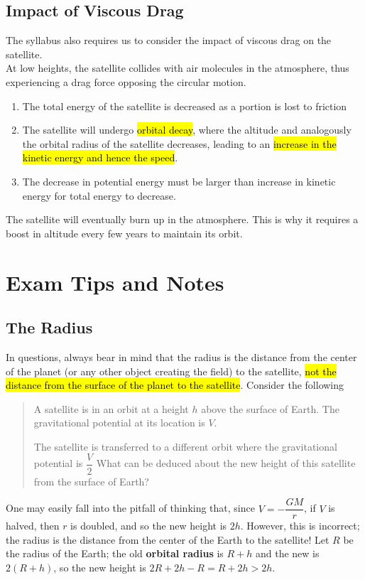 \documentclass[a4paper,12pt]{article}
\let\oldsection\section
\renewcommand\section{\clearpage\oldsection}
\newcommand{\lb}{\\[8pt]}
\begin{document}
\pagebreak

\subsection{Impact of Viscous Drag}

The syllabus also requires us to consider the impact of viscous drag on the satellite.\lb
At low heights, the satellite collides with air molecules in the atmosphere, thus experiencing a drag force opposing the circular motion.
\begin{enumerate}
  \item The total energy of the satellite is decreased as a portion is lost to friction
  \item The satellite will undergo \hl{orbital decay}, where the altitude and analogously the orbital radius of the satellite decreases, leading to an \hl{increase in the kinetic energy and hence the speed}.
  \item The decrease in potential energy must be larger than increase in kinetic energy for total energy to decrease.
\end{enumerate}



The satellite will eventually burn up in the atmosphere. This is why it requires a boost in altitude every few years to maintain its orbit.

\pagebreak

\section{Exam Tips and Notes}

\subsection{The Radius}

In questions, always bear in mind that the radius is the distance from the center of the planet (or any other object creating the field) to the satellite, \hl{not the distance from the surface of the planet to the satellite}. Consider the following
\begin{quote}
  A satellite is in an orbit at a height $h$ above the surface of Earth. The gravitational potential at its location is $V$.

  The satellite is transferred to a different orbit where the gravitational potential is $\dfrac{V}{2}$ What can be deduced about the new height of this satellite from the surface of Earth?
\end{quote}
One may easily fall into the pitfall of thinking that, since $V = -\dfrac{GM}{r}$, if $V$ is halved, then $r$ is doubled, and so the new height is $2h$. However, this is incorrect; the radius is the distance from the center of the Earth to the satellite! Let $R$ be the radius of the Earth; the old \textbf{orbital radius} is $R + h$ and the new is $2(R + h)$, so the new height is $2R + 2h - R = R + 2h > 2h$.
\end{document}
